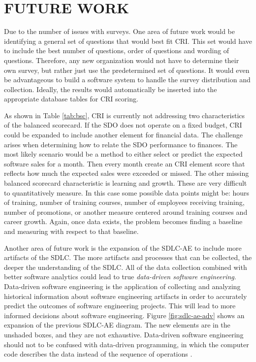 \documentclass[SDSUThesis.tex]{subfiles}
\begin{document}
\section{FUTURE WORK}

    Due to the number of issues with surveys.  One area of future work would be identifying
    a general set of questions that would best fit CRI.  This set would have to include
    the best number of questions, order of questions and wording of questions.  Therefore,
    any new organization would not have to determine their own survey, but rather just use the
    predetermined set of questions.  It would even be advantageous to build a software system to
    handle the survey distribution and collection.  Ideally, the results would automatically be
    inserted into the appropriate database tables for CRI scoring. 
    
    As shown in Table \ref{tab:bsc}, CRI is currently not addressing two 
    characteristics of the balanced scorecard.  If the SDO does not operate 
    on a fixed budget, CRI could be 
    expanded to include another element for financial data. The challenge arises when
    determining how to relate the SDO performance to finances.  The most likely scenario
    would be a method to either select or predict the expected software sales
    for a month.  Then every month create an CRI element score that reflects
    how much the expected sales were exceeded or missed.  The other missing
    balanced scorecard characteristic is learning and growth.  These are very difficult
    to quantitatively measure.  In this case some possible data points might be:
    hours of training, number of training courses, number of employees receiving
    training, number of promotions, or another measure centered around training
    courses and career growth.  Again, once data exists, the problem becomes finding
    a baseline and measuring with respect to that baseline.

    Another area of future work is the expansion of the SDLC-AE to include
    more artifacts of the SDLC.  The more artifacts and processes that can
    be collected, the deeper the understanding of the SDLC.  
    All of the data collection combined with better software analytics
    could lead to true \textit{data-driven software engineering}. Data-driven
    software engineering is the application of collecting and analyzing historical
    information about software engineering artifacts in order to
    accurately predict the outcomes of software engineering projects. This
    will lead to more informed decisions about software engineering.  Figure
    \ref{fig:sdlc-ae-adv} shows an expansion of the previous SDLC-AE diagram.  
    The new elements are in the unshaded boxes, and they are not exhaustive.
    Data-driven software engineering should 
    not to be confused with data-driven programming, in which the computer code
    describes the data instead of the sequence of operations \cite{DDP2015}.
    
\end{document}
